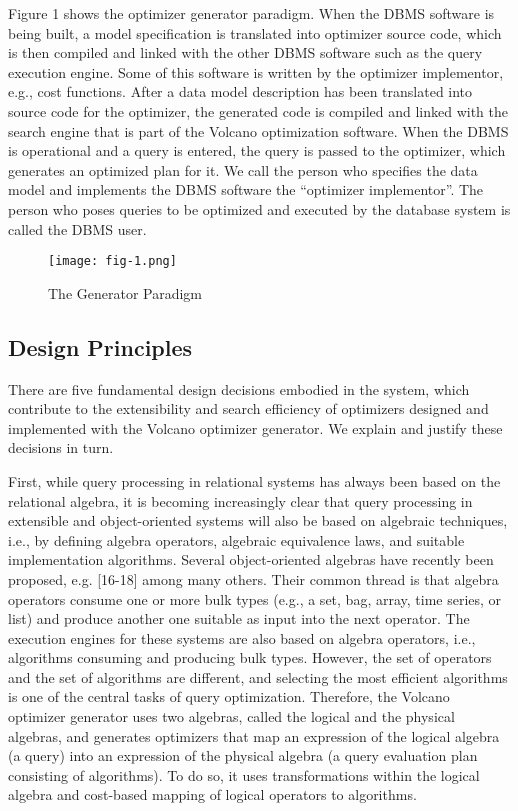 \documentclass[a4paper,12pt,notitlepage,twoside,openright]{article}
\begin{document}
Figure 1 shows the optimizer generator paradigm. When the DBMS software
is being built, a model specification is translated into optimizer
source code, which is then compiled and linked with the other DBMS
software such as the query execution engine. Some of this software is
written by the optimizer implementor, e.g., cost functions. After a data
model description has been translated into source code for the
optimizer, the generated code is compiled and linked with the search
engine that is part of the Volcano optimization software. When the DBMS
is operational and a query is entered, the query is passed to the
optimizer, which generates an optimized plan for it. We call the person
who specifies the data model and implements the DBMS software the
``optimizer implementor''. The person who poses queries to be optimized
and executed by the database system is called the DBMS user.

\begin{figure}
  \centering
  \texttt{[image: fig-1.png]}
  \caption{The Generator Paradigm}
\end{figure}

\hypertarget{design-principles}{%
\subsection{Design Principles}\label{design-principles}}

There are five fundamental design decisions embodied in the system,
which contribute to the extensibility and search efficiency of
optimizers designed and implemented with the Volcano optimizer
generator. We explain and justify these decisions in turn.

First, while query processing in relational systems has always been
based on the relational algebra, it is becoming increasingly clear that
query processing in extensible and object-oriented systems will also be
based on algebraic techniques, i.e., by defining algebra operators,
algebraic equivalence laws, and suitable implementation algorithms.
Several object-oriented algebras have recently been proposed, e.g.
{[}16-18{]} among many others. Their common thread is that algebra
operators consume one or more bulk types (e.g., a set, bag, array, time
series, or list) and produce another one suitable as input into the next
operator. The execution engines for these systems are also based on
algebra operators, i.e., algorithms consuming and producing bulk types.
However, the set of operators and the set of algorithms are different,
and selecting the most efficient algorithms is one of the central tasks
of query optimization. Therefore, the Volcano optimizer generator uses
two algebras, called the logical and the physical algebras, and
generates optimizers that map an expression of the logical algebra (a
query) into an expression of the physical algebra (a query evaluation
plan consisting of algorithms). To do so, it uses transformations within
the logical algebra and cost-based mapping of logical operators to
algorithms.
\end{document}
